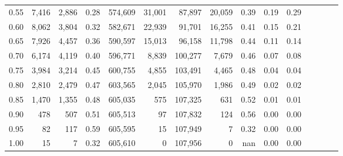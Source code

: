 \begin{tabular}{rrrcrrrrrrrrrrr}
0.55 &    7,416 &   2,886 &                                       0.28 &  574,609 &   31,001 &   87,897 &   20,059 &  0.39 &  0.19 &                         0.29 \\
0.60 &    8,062 &   3,804 &                                       0.32 &  582,671 &   22,939 &   91,701 &   16,255 &  0.41 &  0.15 &                         0.21 \\
0.65 &    7,926 &   4,457 &                                       0.36 &  590,597 &   15,013 &   96,158 &   11,798 &  0.44 &  0.11 &                         0.14 \\
0.70 &    6,174 &   4,119 &                                       0.40 &  596,771 &    8,839 &  100,277 &    7,679 &  0.46 &  0.07 &                         0.08 \\
0.75 &    3,984 &   3,214 &                                       0.45 &  600,755 &    4,855 &  103,491 &    4,465 &  0.48 &  0.04 &                         0.04 \\
0.80 &    2,810 &   2,479 &                                       0.47 &  603,565 &    2,045 &  105,970 &    1,986 &  0.49 &  0.02 &                         0.02 \\
0.85 &    1,470 &   1,355 &                                       0.48 &  605,035 &      575 &  107,325 &      631 &  0.52 &  0.01 &                         0.01 \\
0.90 &      478 &     507 &                                       0.51 &  605,513 &       97 &  107,832 &      124 &  0.56 &  0.00 &                         0.00 \\
0.95 &       82 &     117 &                                       0.59 &  605,595 &       15 &  107,949 &        7 &  0.32 &  0.00 &                         0.00 \\
1.00 &       15 &       7 &                                       0.32 &  605,610 &        0 &  107,956 &        0 &   nan &  0.00 &                         0.00 \\
\bottomrule
\end{tabular}

